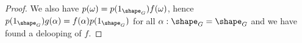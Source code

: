 \begin{proof}
We also have $p(\omega) = p(1_{\shape_G})f(\omega)$, hence
$p(1_{\shape_G})g(\alpha) =  f(\alpha)p(1_{\shape_G})$
for all $\alpha:\shape_G=\shape_G$ and we have found a delooping of $f$.











\end{proof}


